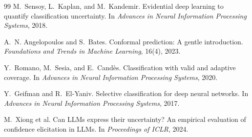 \documentclass[11pt,a4paper]{article}
\begin{document}
\begin{thebibliography}{99}
M.~Sensoy, L.~Kaplan, and M.~Kandemir.
\newblock Evidential deep learning to quantify classification uncertainty.
\newblock In \emph{Advances in Neural Information Processing Systems}, 2018.

A.~N. Angelopoulos and S.~Bates.
\newblock Conformal prediction: A gentle introduction.
\newblock \emph{Foundations and Trends in Machine Learning}, 16(4), 2023.

Y.~Romano, M.~Sesia, and E.~Cand{\`e}s.
\newblock Classification with valid and adaptive coverage.
\newblock In \emph{Advances in Neural Information Processing Systems}, 2020.

Y.~Geifman and R.~El-Yaniv.
\newblock Selective classification for deep neural networks.
\newblock In \emph{Advances in Neural Information Processing Systems}, 2017.

M.~Xiong et al.
\newblock Can LLMs express their uncertainty? An empirical evaluation of confidence elicitation in LLMs.
\newblock In \emph{Proceedings of ICLR}, 2024.

\end{thebibliography}
\end{document}
